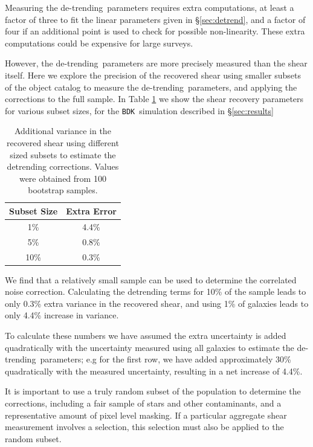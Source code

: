 \documentclass[a4paper,fleqn,usenatbib]{mnras}
\newcommand{\detrend}{de-trending}
\newcommand{\bdsim}{\texttt{BDK}}
\begin{document}
Measuring the \detrend\ parameters requires extra computations, at least a
factor of three to fit the linear parameters given in \S \ref{sec:detrend}, and
a factor of four if an additional point is used to check for possible
non-linearity. These extra computations could be expensive for large surveys.  

However, the \detrend\ parameters are more precisely measured than the shear
itself.  Here we explore the precision of the recovered shear using smaller
subsets of the object catalog to measure the \detrend\ parameters, and
applying the corrections to the full sample.  In Table \ref{tab:subsets}
we show the shear recovery parameters for various subset sizes, for the
\bdsim\ simulation described in \S \ref{sec:results}

\begin{table}
    \centering
    \caption{Additional variance in the recovered shear 
        using different sized subsets to
        estimate the detrending corrections.  Values were obtained
        from 100 bootstrap samples. \label{tab:subsets}}
    \begin{tabular}{| c | c |}
        Subset Size & Extra Error \\
        \hline
        1\% & 4.4\% \\
        5\% & 0.8\% \\
        10\% & 0.3\% \\
    \end{tabular}
\end{table}


We find that a relatively small sample can be used to determine the correlated
noise correction.  Calculating the detrending terms for 10\% of the sample
leads to only 0.3\% extra variance in the recovered shear, and using 1\% of
galaxies leads to only 4.4\% increase in variance.

To calculate these numbers we have assumed the extra uncertainty is added
quadratically with the uncertainty measured using all galaxies to estimate the
\detrend\ parameters; e.g for the first row, we have added approximately 30\%
quadratically with the measured uncertainty, resulting in a net increase of
4.4\%.

It is important to use a truly random subset of the population to determine the
corrections, including a fair sample of stars and other contaminants, and a
representative amount of pixel level masking.  If a particular aggregate shear
measurement involves a selection, this selection must also be applied to the
random subset.
\end{document}
